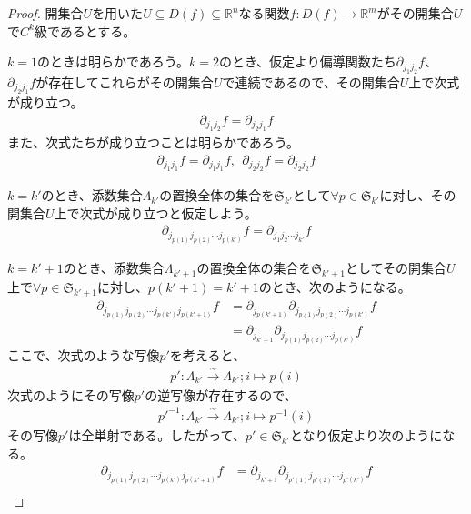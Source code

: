 \documentclass[dvipdfmx]{jsarticle}
\begin{document}
\begin{proof}
開集合$U$を用いた$U \subseteq D(f) \subseteq \mathbb{R}^{n}$なる関数$f:D(f) \rightarrow \mathbb{R}^{m}$がその開集合$U$で$C^{k}$級であるとする。\par
$k = 1$のときは明らかであろう。$k = 2$のとき、仮定より偏導関数たち$\partial_{j_{1}j_{2}}f$、$\partial_{j_{2}j_{1}}f$が存在してこれらがその開集合$U$で連続であるので、その開集合$U$上で次式が成り立つ。
\begin{align*}
\partial_{j_{1}j_{2}}f = \partial_{j_{2}j_{1}}f
\end{align*}
また、次式たちが成り立つことは明らかであろう。
\begin{align*}
\partial_{j_{1}j_{1}}f = \partial_{j_{1}j_{1}}f,\ \ \partial_{j_{2}j_{2}}f = \partial_{j_{2}j_{2}}f
\end{align*}\par
$k = k'$のとき、添数集合$\varLambda_{k'}$の置換全体の集合を$\mathfrak{S}_{k'}$として$\forall p \in \mathfrak{S}_{k'}$に対し、その開集合$U$上で次式が成り立つと仮定しよう。
\begin{align*}
\partial_{j_{p(1)}j_{p(2)}\cdots j_{p\left( k' \right)}}f = \partial_{j_{1}j_{2}\cdots j_{k'}}f
\end{align*}\par
$k = k' + 1$のとき、添数集合$\varLambda_{k' + 1}$の置換全体の集合を$\mathfrak{S}_{k' + 1}$としてその開集合$U$上で$\forall p \in \mathfrak{S}_{k' + 1}$に対し、$p\left( k' + 1 \right) = k' + 1$のとき、次のようになる。
\begin{align*}
\partial_{j_{p(1)}j_{p(2)}\cdots j_{p\left( k' \right)}j_{p\left( k' + 1 \right)}}f &= \partial_{j_{p\left( k' + 1 \right)}}\partial_{j_{p(1)}j_{p(2)}\cdots j_{p\left( k' \right)}}f\\
&= \partial_{j_{k' + 1}}\partial_{j_{p(1)}j_{p(2)}\cdots j_{p\left( k' \right)}}f
\end{align*}
ここで、次式のような写像$p'$を考えると、
\begin{align*}
p':\varLambda_{k'}\overset{\sim}{\rightarrow}\varLambda_{k'};i \mapsto p(i)
\end{align*}
次式のようにその写像$p'$の逆写像が存在するので、
\begin{align*}
{p'}^{- 1}:\varLambda_{k'}\overset{\sim}{\rightarrow}\varLambda_{k'};i \mapsto p^{- 1}(i)
\end{align*}
その写像$p'$は全単射である。したがって、$p' \in \mathfrak{S}_{k'}$となり仮定より次のようになる。
\begin{align*}
\partial_{j_{p(1)}j_{p(2)}\cdots j_{p\left( k' \right)}j_{p\left( k' + 1 \right)}}f &= \partial_{j_{k' + 1}}\partial_{j_{p'(1)}j_{p'(2)}\cdots j_{p'\left( k' \right)}}f\\

\end{align*}
\end{proof}
\end{document}
